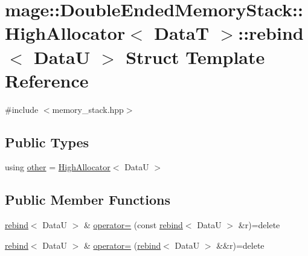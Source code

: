 \hypertarget{structmage_1_1_double_ended_memory_stack_1_1_high_allocator_1_1rebind}{}\section{mage\+:\+:Double\+Ended\+Memory\+Stack\+:\+:High\+Allocator$<$ DataT $>$\+:\+:rebind$<$ DataU $>$ Struct Template Reference}
\label{structmage_1_1_double_ended_memory_stack_1_1_high_allocator_1_1rebind}


{\ttfamily \#include $<$memory\+\_\+stack.\+hpp$>$}

\subsection*{Public Types}
\begin{DoxyCompactItemize}
\item 
using \hyperlink{structmage_1_1_double_ended_memory_stack_1_1_high_allocator_1_1rebind_aee127399c76826ea9b23986ee10f19fa}{other} = \hyperlink{structmage_1_1_double_ended_memory_stack_1_1_high_allocator}{High\+Allocator}$<$ DataU $>$
\end{DoxyCompactItemize}
\subsection*{Public Member Functions}
\begin{DoxyCompactItemize}
\item 
\hyperlink{structmage_1_1_double_ended_memory_stack_1_1_high_allocator_1_1rebind}{rebind}$<$ DataU $>$ \& \hyperlink{structmage_1_1_double_ended_memory_stack_1_1_high_allocator_1_1rebind_a3b2599c125b2a1899d300c7f5c041141}{operator=} (const \hyperlink{structmage_1_1_double_ended_memory_stack_1_1_high_allocator_1_1rebind}{rebind}$<$ DataU $>$ \&r)=delete
\item 
\hyperlink{structmage_1_1_double_ended_memory_stack_1_1_high_allocator_1_1rebind}{rebind}$<$ DataU $>$ \& \hyperlink{structmage_1_1_double_ended_memory_stack_1_1_high_allocator_1_1rebind_a5170f26b07ec13b8f2dd5d7a5e6f6d46}{operator=} (\hyperlink{structmage_1_1_double_ended_memory_stack_1_1_high_allocator_1_1rebind}{rebind}$<$ DataU $>$ \&\&r)=delete
\end{DoxyCompactItemize}
